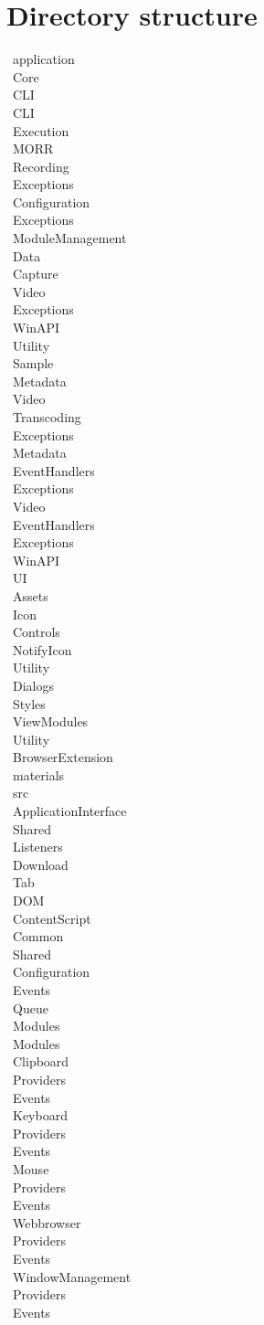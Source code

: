 \chapter{Directory structure}
\label{ch:dirstructure}
\newcommand{\tab}[1][1cm]{\hspace*{#1}}
\newcommand{\dir}[2]{\tab[#1cm] \textbullet \ #2 \\}

\dir{0}{application}
    \dir{0.5}{Core}
        \dir{1}{CLI}
            \dir{1.5}{CLI}
            \dir{1.5}{Execution}
        \dir{1}{MORR}
            \dir{1.5}{Recording}
                \dir{2}{Exceptions}
            \dir{1.5}{Configuration}
                \dir{2}{Exceptions}
            \dir{1.5}{ModuleManagement}
            \dir{1.5}{Data}
                \dir{2}{Capture}
                    \dir{2.5}{Video}
                        \dir{3}{Exceptions}
                        \dir{3}{WinAPI}
                            \dir{3.5}{Utility}
                \dir{2}{Sample}
                    \dir{2.5}{Metadata}
                    \dir{2.5}{Video}
                \dir{2}{Transcoding}
                    \dir{2.5}{Exceptions}
                    \dir{2.5}{Metadata}
                        \dir{3}{EventHandlers}
                        \dir{3}{Exceptions}
                    \dir{2.5}{Video}
                        \dir{3}{EventHandlers}
                        \dir{3}{Exceptions}
                    \dir{2.5}{WinAPI}
        \dir{1}{UI}
            \dir{1.5}{Assets}
                \dir{2}{Icon}
            \dir{1.5}{Controls}
                \dir{2}{NotifyIcon}
                \dir{2}{Utility}
            \dir{1.5}{Dialogs}
            \dir{1.5}{Styles}
            \dir{1.5}{ViewModules}
                \dir{2}{Utility}
    \dir{0.5}{BrowserExtension}
        \dir{1}{materials}
        \dir{1}{src}
            \dir{1.5}{ApplicationInterface}
            \dir{1.5}{Shared}
            \dir{1.5}{Listeners}
                \dir{2}{Download}
                \dir{2}{Tab}
                \dir{2}{DOM}
                    \dir{2.5}{ContentScript}
    \dir{0.5}{Common}
        \dir{1}{Shared}
            \dir{1.5}{Configuration}
            \dir{1.5}{Events}
                \dir{2}{Queue}
            \dir{1.5}{Modules}
    \dir{0.5}{Modules}
        \dir{1}{Clipboard}
            \dir{1.5}{Providers}
            \dir{1.5}{Events}
        \dir{1}{Keyboard}
            \dir{1.5}{Providers}
            \dir{1.5}{Events}
        \dir{1}{Mouse}
            \dir{1.5}{Providers}
            \dir{1.5}{Events}
        \dir{1}{Webbrowser}
            \dir{1.5}{Providers}
            \dir{1.5}{Events}
        \dir{1}{WindowManagement}
            \dir{1.5}{Providers}
            \dir{1.5}{Events}